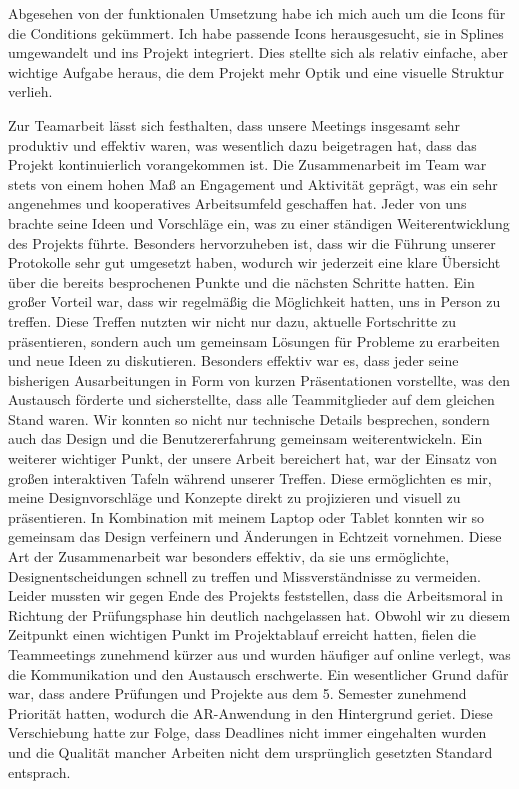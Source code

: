 \documentclass[11pt]{article}
\begin{document}
    Abgesehen von der funktionalen Umsetzung habe ich mich auch um die Icons für die Conditions gekümmert. Ich habe passende Icons herausgesucht, sie in Splines umgewandelt und ins Projekt integriert. Dies stellte sich als relativ einfache, aber wichtige Aufgabe heraus, die dem Projekt mehr Optik und eine visuelle Struktur verlieh.

    Zur Teamarbeit lässt sich festhalten, dass unsere Meetings insgesamt sehr produktiv und effektiv waren, was wesentlich dazu beigetragen hat, dass das Projekt kontinuierlich vorangekommen ist. Die Zusammenarbeit im Team war stets von einem hohen Maß an Engagement und Aktivität geprägt, was ein sehr angenehmes und kooperatives Arbeitsumfeld geschaffen hat. Jeder von uns brachte seine Ideen und Vorschläge ein, was zu einer ständigen Weiterentwicklung des Projekts führte. Besonders hervorzuheben ist, dass wir die Führung unserer Protokolle sehr gut umgesetzt haben, wodurch wir jederzeit eine klare Übersicht über die bereits besprochenen Punkte und die nächsten Schritte hatten.
    Ein großer Vorteil war, dass wir regelmäßig die Möglichkeit hatten, uns in Person zu treffen. Diese Treffen nutzten wir nicht nur dazu, aktuelle Fortschritte zu präsentieren, sondern auch um gemeinsam Lösungen für Probleme zu erarbeiten und neue Ideen zu diskutieren. Besonders effektiv war es, dass jeder seine bisherigen Ausarbeitungen in Form von kurzen Präsentationen vorstellte, was den Austausch förderte und sicherstellte, dass alle Teammitglieder auf dem gleichen Stand waren. Wir konnten so nicht nur technische Details besprechen, sondern auch das Design und die Benutzererfahrung gemeinsam weiterentwickeln.
    Ein weiterer wichtiger Punkt, der unsere Arbeit bereichert hat, war der Einsatz von großen interaktiven Tafeln während unserer Treffen. Diese ermöglichten es mir, meine Designvorschläge und Konzepte direkt zu projizieren und visuell zu präsentieren. In Kombination mit meinem Laptop oder Tablet konnten wir so gemeinsam das Design verfeinern und Änderungen in Echtzeit vornehmen. Diese Art der Zusammenarbeit war besonders effektiv, da sie uns ermöglichte, Designentscheidungen schnell zu treffen und Missverständnisse zu vermeiden.
    Leider mussten wir gegen Ende des Projekts feststellen, dass die Arbeitsmoral in Richtung der Prüfungsphase hin deutlich nachgelassen hat. Obwohl wir zu diesem Zeitpunkt einen wichtigen Punkt im Projektablauf erreicht hatten, fielen die Teammeetings zunehmend kürzer aus und wurden häufiger auf online verlegt, was die Kommunikation und den Austausch erschwerte. Ein wesentlicher Grund dafür war, dass andere Prüfungen und Projekte aus dem 5. Semester zunehmend Priorität hatten, wodurch die AR-Anwendung in den Hintergrund geriet. Diese Verschiebung hatte zur Folge, dass Deadlines nicht immer eingehalten wurden und die Qualität mancher Arbeiten nicht dem ursprünglich gesetzten Standard entsprach.
\end{document}
